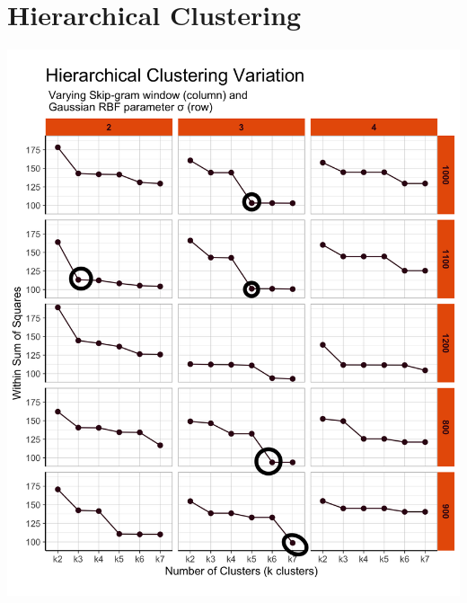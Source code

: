 %
%
%

\section{Hierarchical Clustering}



 \includegraphics[width=6in]{Content/Images/hclust_variation.png}\\\vspace*{25mm}
 
 


